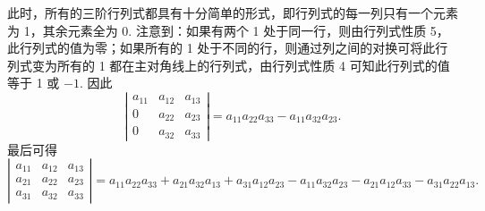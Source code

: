 \documentclass[UTF8, 12pt, fontset=fandol, oneside]{ctexart}
\begin{document}
此时，所有的三阶行列式都具有十分简单的形式，即行列式的每一列只有一个元素为 1，其余元素全为 0. 注意到：如果有两个 1 处于同一行，则由行列式性质 5，此行列式的值为零；如果所有的 1 处于不同的行，则通过列之间的对换可将此行列式变为所有的 1 都在主对角线上的行列式，由行列式性质 4 可知此行列式的值等于 1 或 $-1$. 因此
\[
\left|\begin{array}{ccc}
a_{11} & a_{12} & a_{13}\\
0 & a_{22} & a_{23}\\
0 & a_{32} & a_{33}
\end{array}\right|
=a_{11}a_{22}a_{33}-a_{11}a_{32}a_{23}.
\]
最后可得
\[
\left|\begin{array}{ccc}
a_{11} & a_{12} & a_{13}\\
a_{21} & a_{22} & a_{23}\\
a_{31} & a_{32} & a_{33}
\end{array}\right|
=a_{11}a_{22}a_{33}+a_{21}a_{32}a_{13}+a_{31}a_{12}a_{23}
-a_{11}a_{32}a_{23}-a_{21}a_{12}a_{33}-a_{31}a_{22}a_{13}.
\]
\end{document}
